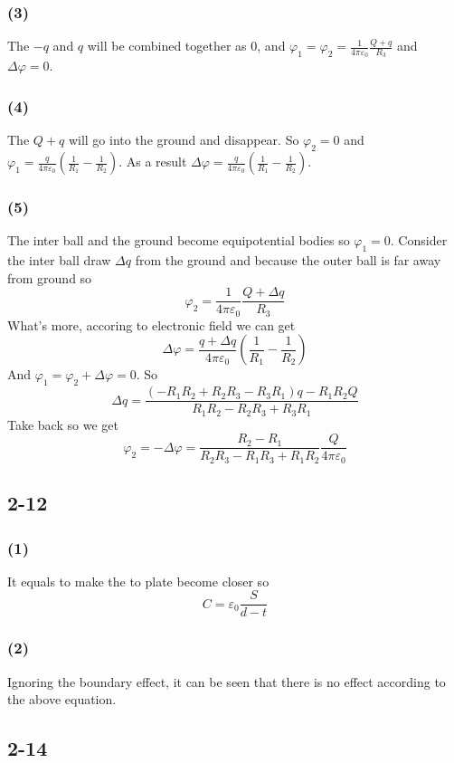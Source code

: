 \documentclass[a4paper,11pt]{amsart}
\theoremstyle{definition}
\begin{document}
	\subsubsection*{(3)}
	The $-q$ and $q$ will be combined together as 0, and $\displaystyle\varphi_1=\varphi_2=\frac{1}{4\pi \varepsilon _0}\frac{Q+q}{R_3}$ and $\Delta \varphi =0$.
	
	\subsubsection*{(4)}
	The $Q+q$ will go into the ground and disappear. So $\varphi_2=0$ and $\varphi_1=\displaystyle\frac{q}{4\pi \varepsilon _0}\left( \frac{1}{R_1}-\frac{1}{R_2} \right)$. As a result $\displaystyle\Delta \varphi= \frac{q}{4\pi \varepsilon _0}\left( \frac{1}{R_1}-\frac{1}{R_2} \right) .$
	\subsubsection*{(5)}
	The inter ball and the ground become equipotential bodies so $\varphi_1=0$. Consider the inter ball draw $\Delta q$ from the ground and because the outer ball is far away from ground so 
	$$
	\varphi_2=\frac{1}{4\pi \varepsilon _0}\frac{Q+\Delta q}{R_3}
	$$
	What's more, accoring to electronic field we can get
	$$
	\Delta \varphi =\frac{q+\Delta q}{4\pi \varepsilon _0}\left( \frac{1}{R_1}-\frac{1}{R_2} \right) 
	$$
	And $\varphi _1=\varphi _2+\Delta\varphi=0$. So 
	$$
	\Delta q=\frac{\left( -R_1R_2+R_2R_3-R_3R_1 \right) q-R_1R_2Q}{R_1R_2-R_2R_3+R_3R_1}
	$$
	Take back so we get
	$$
	\varphi _2=-\Delta \varphi =\frac{R_2-R_1}{R_2R_3-R_1R_3+R_1R_2}\frac{Q}{4\pi \varepsilon _0}
	$$
	\subsection*{2-12}
	\subsubsection*{(1)}
	It equals to make the to plate become closer so
	$$
	C=\varepsilon_0\dfrac{S}{d-t}
	$$
	\subsubsection*{(2)}
	Ignoring the boundary effect, it can be seen that there is no effect according to the above equation.
	
	\subsection*{2-14}
\end{document}
